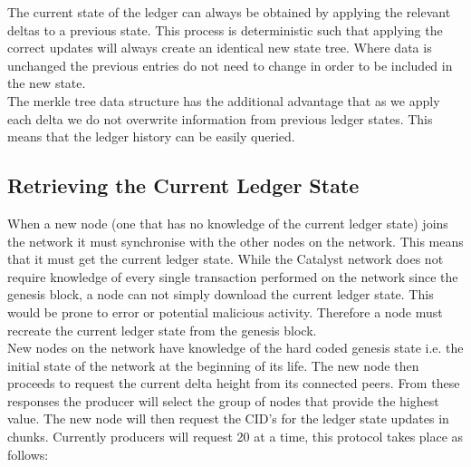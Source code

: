 The current state of the ledger can always be obtained by applying the relevant deltas to a previous state. This process is deterministic such that applying the correct updates will always create an identical new state tree. Where data is unchanged the previous entries do not need to change in order to be included in the new state.\\

The merkle tree data structure has the additional advantage that as we apply each delta we do not overwrite information from previous ledger states. This means that the ledger history can be easily queried. \\

\subsection{Retrieving the Current Ledger State}

When a new node (one that has no knowledge of the current ledger state) joins the network it must synchronise with the other nodes on the network. This means that it must get the current ledger state. While the Catalyst network does not require knowledge of every single transaction performed on the network since the genesis block, a node can not simply download the current ledger state. This would be prone to error or potential malicious activity. Therefore a node must recreate the current ledger state from the genesis block. \\

New nodes on the network have knowledge of the hard coded genesis state i.e. the initial state of the network at the beginning of its life. The new node then proceeds to request the current delta height from its connected peers. From these responses the producer will select the group of nodes that provide the highest value. The new node will then request the CID's for the ledger state updates in chunks. Currently producers will request 20 at a time, this protocol takes place as follows: \\

